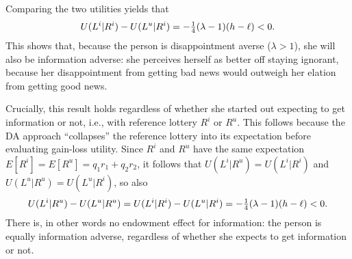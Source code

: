 Comparing the two utilities yields that
\begin{equation*}
  U(L^i|R^i) - U(L^u|R^i) = -\tfrac{1}{4}(\lambda-1)(h-\ell) < 0.
\end{equation*}
This shows that, because the person is disappointment averse ($\lambda > 1$),
she will also be information adverse: she perceives herself as better off
staying ignorant, because her disappointment from getting bad news would
outweigh her elation from getting good news.

Crucially, this result holds regardless of whether she started out expecting
to get information or not, i.e., with reference lottery $R^i$ or $R^u$. This
follows because the DA approach \enquote{collapses} the reference lottery into its expectation before evaluating gain-loss utility. Since $R^i$ and $R^u$
have the same expectation $E[R^i] = E[R^u] = q_1r_1 + q_2r_2$, it follows that
$U(L^i|R^u) = U(L^i|R^i)$ and $U(L^u|R^u) = U(L^u|R^i)$, so also
\begin{equation*}
  U(L^i|R^u) - U(L^u|R^u) = U(L^i|R^i) - U(L^u|R^i) = -\tfrac{1}{4}(\lambda-1)(h-\ell) < 0.
\end{equation*}
There is, in other words no endowment effect for information: the person is
equally information adverse, regardless of whether she expects to get
information or not.

